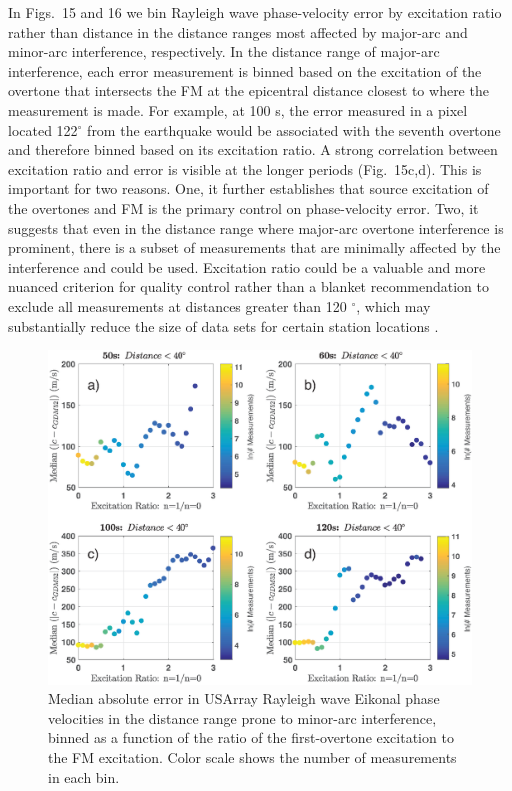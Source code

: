 \documentclass[extra,mreferee]{gji}
\begin{document}
In Figs.\ 15 and 16 we bin Rayleigh wave phase-velocity error by excitation ratio rather than distance in the distance ranges most affected by major-arc and minor-arc interference, respectively. In the distance range of major-arc interference, each error measurement is binned based on the excitation of the overtone that intersects the FM at the epicentral distance closest to where the measurement is made. For example, at 100 s, the error measured in a pixel located 122$^\circ$ from the earthquake would be associated with the seventh overtone and therefore binned based on its excitation ratio. A strong correlation between excitation ratio and error is visible at the longer periods (Fig.\ 15c,d). This is important for two reasons. One, it further establishes that source excitation of the overtones and FM is the primary control on phase-velocity error. Two, it suggests that even in the distance range where major-arc overtone interference is prominent, there is a subset of measurements that are minimally affected by the interference and could be used. Excitation ratio could be a valuable and more nuanced criterion for quality control rather than a blanket recommendation to exclude all measurements at distances greater than 120 $^\circ$, which may substantially reduce the size of data sets for certain station locations \citep{hariharan2020evidence}. 

\begin{figure}
 \includegraphics[width=1\textwidth]{Fig16_Sver.eps}
 \caption{Median absolute error in USArray Rayleigh wave Eikonal phase velocities in the distance range prone to minor-arc interference, binned as a function of the ratio of the first-overtone excitation to the FM excitation. Color scale shows the number of measurements in each bin.}
\end{figure}
\end{document}
